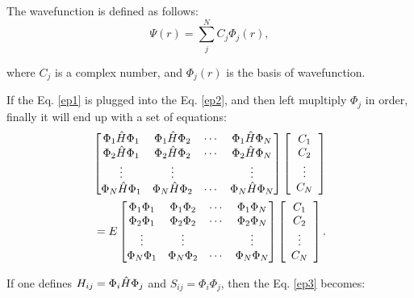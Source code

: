 \documentclass[a4paper, 12pt, titlepage,oneside,drop]{kthesis}
\begin{document}
The wavefunction is defined as follows:
\begin{equation}\label{ep1}
 \Psi (r) = \sum\limits_j^N C_j \Phi_j (r),
\end{equation}
 
\noindent where $C_j$ is a complex number, and $\Phi_j (r)$ is the basis of wavefunction. 


\noindent If the Eq. \ref{ep1} is plugged into the Eq. \ref{ep2}, and then left mupltiply $\Phi_j$ in order, finally it will end up with a set of equations:
\begin{equation}\begin{split}\label{ep3}
\left[
\begin{matrix}
    \Phi_1 \hat{H} \Phi_1 & \Phi_1 \hat{H} \Phi_2 & \cdots & \Phi_1 \hat{H} \Phi_N \\
    \Phi_2 \hat{H} \Phi_1 & \Phi_2 \hat{H} \Phi_2 & \cdots & \Phi_2 \hat{H} \Phi_N \\
    \vdots               & \vdots               &        & \vdots               \\
    \Phi_N \hat{H} \Phi_1 & \Phi_N \hat{H} \Phi_2 & \cdots & \Phi_N \hat{H} \Phi_N \\
\end{matrix} \right] \left[ \begin{array}{c} C_1 \\ C_2 \\ \vdots \\ C_N\end{array} \right] \\
=E \left[
\begin{matrix}
    \Phi_1 \Phi_1 & \Phi_1 \Phi_2 & \cdots & \Phi_1 \Phi_N \\
   \Phi_2 \Phi_1 & \Phi_2 \Phi_2 & \cdots & \Phi_2 \Phi_N \\
    \vdots               & \vdots               &        & \vdots               \\
   \Phi_N \Phi_1 & \Phi_N \Phi_2 & \cdots & \Phi_N \Phi_N \\
\end{matrix} \right]\left[ \begin{array}{c} C_1 \\ C_2 \\ \vdots \\ C_N\end{array} \right].
\end{split}\end{equation}

\noindent If one defines $H_{ij} = \Phi_i \hat{H} \Phi_j$ and $S_{ij} = \Phi_i \Phi_j$, then the Eq. \ref{ep3} becomes:
\end{document}

